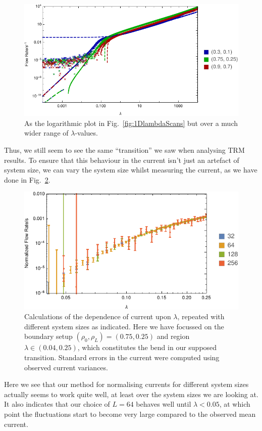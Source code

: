 \begin{figure} \caption[As Fig.~\ref{fig:1DlambdaScans} but over a much wider range of $\lambda$-values.]{As the logarithmic plot in Fig.~\ref{fig:1DlambdaScans} but over a  much wider range of $\lambda$-values.} 
\label{fig:1DlambdaScansLogged}
\begin{center}
\includegraphics[width=1.0\textheight, angle=270]{numerics/images/lambdaScan/allDataWide}
\end{center}
\end{figure}
Thus, we still seem to see the same ``transition'' we saw when analysing TRM results. To ensure that this
behaviour in the current isn't just an artefact of system size, we can vary the system size whilst
measuring the current, as we have done in Fig.~\ref{fig:lambdaScanRepeats}.
\begin{figure} \caption[Calculations of the dependence of current upon $\lambda$, repeated with different system sizes.]{Calculations of the dependence of current upon $\lambda$, repeated with different system sizes as indicated. Here we have focussed on the boundary setup 
$(\rho_0, \rho_L) = (0.75, 0.25)$ and region $\lambda \in (0.04, 0.25)$, which constitutes the
bend in our supposed transition. Standard errors in the current were computed using observed current 
variances.} 
\label{fig:lambdaScanRepeats}
\begin{center}
\includegraphics[width=0.95\textheight, angle=270]{numerics/images/lambdaScan/lambdaScanRepeatFlows}
\end{center}
\end{figure}
Here we see that our method for normalising currents for different system sizes actually seems
to work quite well, at least over the system sizes we are looking at. It also indicates that our choice of
$L=64$ behaves well until $\lambda < 0.05$, at which point the fluctuations start to become very large 
compared to the observed mean current.

